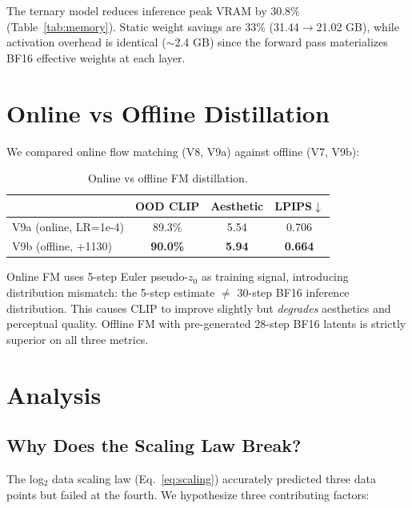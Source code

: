 \documentclass[10pt,twocolumn]{article}
\begin{document}
The ternary model reduces inference peak VRAM by 30.8\% (Table~\ref{tab:memory}).
Static weight savings are 33\% (31.44$\to$21.02 GB), while activation overhead is identical ($\sim$2.4 GB) since the forward pass materializes BF16 effective weights at each layer.

\section{Online vs Offline Distillation}

We compared online flow matching (V8, V9a) against offline (V7, V9b):

\begin{table}[h]
\centering
\caption{Online vs offline FM distillation.}
\label{tab:online_offline}
\small
\begin{tabular}{lccc}
\toprule
& \textbf{OOD CLIP} & \textbf{Aesthetic} & \textbf{LPIPS$\downarrow$} \\
\midrule
V9a (online, LR=1e-4) & 89.3\% & 5.54 & 0.706 \\
V9b (offline, +1130) & \textbf{90.0\%} & \textbf{5.94} & \textbf{0.664} \\
\bottomrule
\end{tabular}
\end{table}

Online FM uses 5-step Euler pseudo-$z_0$ as training signal, introducing distribution mismatch: the 5-step estimate $\neq$ 30-step BF16 inference distribution.
This causes CLIP to improve slightly but \emph{degrades} aesthetics and perceptual quality.
Offline FM with pre-generated 28-step BF16 latents is strictly superior on all three metrics.

\section{Analysis}

\subsection{Why Does the Scaling Law Break?}

The log$_2$ data scaling law (Eq.~\ref{eq:scaling}) accurately predicted three data points but failed at the fourth.
We hypothesize three contributing factors:
\end{document}
